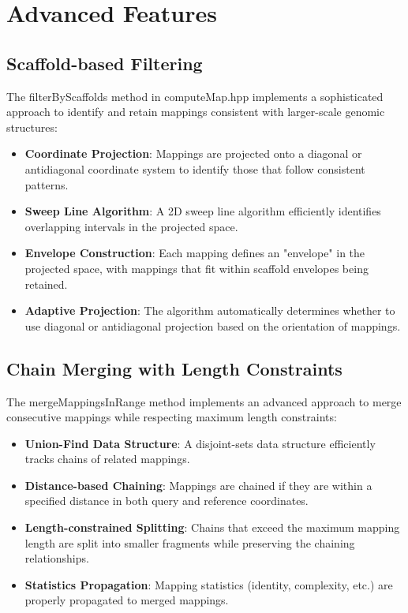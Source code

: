 \documentclass{article}
\begin{document}
\section{Advanced Features}

\subsection{Scaffold-based Filtering}

The filterByScaffolds method in computeMap.hpp implements a sophisticated approach to identify and retain mappings consistent with larger-scale genomic structures:

\begin{itemize}
    \item \textbf{Coordinate Projection}: Mappings are projected onto a diagonal or antidiagonal coordinate system to identify those that follow consistent patterns.
    
    \item \textbf{Sweep Line Algorithm}: A 2D sweep line algorithm efficiently identifies overlapping intervals in the projected space.
    
    \item \textbf{Envelope Construction}: Each mapping defines an "envelope" in the projected space, with mappings that fit within scaffold envelopes being retained.
    
    \item \textbf{Adaptive Projection}: The algorithm automatically determines whether to use diagonal or antidiagonal projection based on the orientation of mappings.
\end{itemize}

\subsection{Chain Merging with Length Constraints}

The mergeMappingsInRange method implements an advanced approach to merge consecutive mappings while respecting maximum length constraints:

\begin{itemize}
    \item \textbf{Union-Find Data Structure}: A disjoint-sets data structure efficiently tracks chains of related mappings.
    
    \item \textbf{Distance-based Chaining}: Mappings are chained if they are within a specified distance in both query and reference coordinates.
    
    \item \textbf{Length-constrained Splitting}: Chains that exceed the maximum mapping length are split into smaller fragments while preserving the chaining relationships.
    
    \item \textbf{Statistics Propagation}: Mapping statistics (identity, complexity, etc.) are properly propagated to merged mappings.
\end{itemize}
\end{document}
